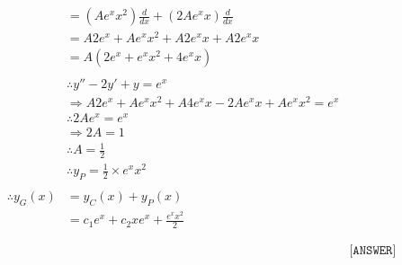 \documentclass{article}
\begin{document}
\begin{homeworkProblem}
\[\begin{split}
        &= (A e^x x^2)\frac{d}{dx} + (2 A e^x x) \frac{d}{dx}
        \\
        &= A 2 e^x +  A e^x x^2 + A 2 e^x x + A 2 e^x x
        \\
        &= A(2e^x + e^xx^2 + 4 e^x x)
        \\\\
        &\therefore {y}'' - 2{y}' + y = e^x
        \\
        &\Rightarrow A 2 e^x + A e^x x^2 + A 4 e^x x - 2 A e^x x + A e^x x^2 = e^x
        \\
        &\therefore 2 A e^x = e^x
        \\
        &\Rightarrow 2 A = 1
        \\
        &\therefore A = \frac{1}{2}
        \\
        &\therefore y_P = \frac{1}{2} \times e^x x^2
        \\\\
        \therefore y_G(x) &= y_C(x) + y_P(x)
        \\
        &= c_1 e^x + c_2 x e^x + \frac{e^x x^2}{2}
        \\
        \\
        \\
        & & \texttt{[ANSWER]}
    \end{split}
    \]
\end{homeworkProblem}

\pagebreak
\end{document}
